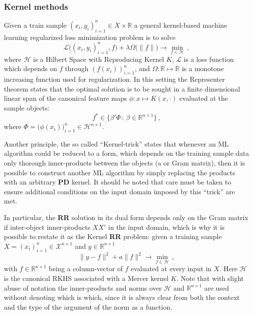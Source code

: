 \documentclass[a4paper,14pt]{extarticle}
\newcommand{\Hcal}{\mathcal{H}}
\newcommand{\Xcal}{\mathcal{X}}
\newcommand{\Real}{\mathbb{R}}
\newcommand{\Lcal}{\mathcal{L}}
\begin{document}

\subsubsection{Kernel methods} %
\label{ssub:kernel_methods}

Given a train sample $(x_i, y_i)_{i=1}^n \in X\times \Real$ a general kernel-based
machine learning regularized loss minimization problem is to solve
$$ \Lcal\bigl((x_i, y_i)_{i=1}^n, f\bigr)
  + \lambda \Omega\bigl(\|f\|\bigr)
  \to \min_{f\in \Hcal}\,, $$
where $\Hcal$ is a Hilbert Space with Reproducing Kernel $K$, $\Lcal$ is a loss
function which depends on $f$ through $(f(x_i))_{i=1}^n$, and $\Omega:\Real\mapsto\Real$
is a monotone increasing function used for regularization. In this setting the Representer
theorem states that the optimal solution is to be sought in a finite dimensional
linear span of the canonical feature maps $\phi: x\mapsto K(x, \cdot)$ evaluated at
the sample objects:
$$ f^* \in \bigl\{ \beta'\Phi\,:\, \beta \in \Real^{n\times 1} \bigr\} \,, $$
where $\Phi = \bigl(\phi(x_i)\bigr)_{i=1}^n \in \Hcal^{n\times 1}$.

Another principle, the so called ``Kernel-trick'' states that whenever an ML algorithm
could be reduced to a form, which depends on the training sample data only thorough
inner-products between the objects (a or Gram matrix), then it is possible to construct
another ML algorithm by simply replacing the products with an arbitrary \textbf{PD}
kernel. It should be noted that care must be taken to ensure additional conditions
on the input domain imposed by this ``trick'' are met.

In particular, the \textbf{RR} solution in its dual form depends only on the Gram
matrix if inter-object inner-products $X X'$ in the input domain, which is why it is
possible to restate it as the Kernel \textbf{RR} problem: given a training sample
$X = (x_i)_{i=1}^n\in\Xcal^{n\times 1}$ and $y\in\Real^{n\times 1}$
$$ \|y - f\|^2 + a \|f\|^2 \to \min_{f \in \Hcal} \,, $$
with $f \in \Real^{n\times 1}$ being a column-vector of $f$ evaluated at every input
in $X$. Here $\Hcal$ is the canonical RKHS associated with a Mercer kernel $K$. Note
that with slight abuse of notation the inner-products and norms over $\Hcal$ and
$\Real^{n\times 1}$ are used without denoting which is which, since it is always
clear from both the context and the type of the argument of the norm as a function.
\end{document}
